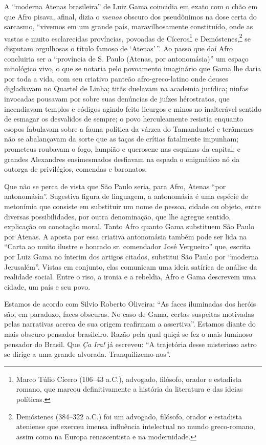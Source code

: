 A ``moderna Atenas brasileira'' de Luiz Gama coincidia em exato com o chão
em que Afro pisava, afinal, dizia o \emph{menos} obscuro dos
pseudônimos na dose certa do sarcasmo, ``vivemos em um grande país,
maravilhosamente constituído, onde as vastas e muito esclarecidas
províncias, povoadas de Cíceros\footnote{Marco Túlio Cícero (106--43 a.C.), advogado, filósofo, orador e estadista romano, que
  marcou definitivamente a história da literatura e das ideias
  políticas.} e Demóstenes,\footnote{Demóstenes (384--322 a.C.) foi
  um advogado, filósofo, orador e estadista ateniense que exerceu imensa
  influência intelectual no mundo greco-romano, assim como na Europa
  renascentista e na modernidade.} se disputam orgulhosas o título
famoso de `Atenas'\,''. Ao passo que daí Afro concluiria ser a
``província de S. Paulo (Atenas, por antonomásia)'' um espaço mitológico
vivo, o que se notaria pelo povoamento imaginário que Gama lhe daria por
toda a vida, com seu criativo panteão afro-greco-latino onde
deuses digladiavam no Quartel de Linha; titãs duelavam na
academia jurídica; ninfas invocadas pousavam por sobre suas
denúncias de juízes hérostratos, que incendiavam templos e
códigos agindo feito licurgos e minos no inalterável
sentido de esmagar os desvalidos de sempre; o povo herculeamente
resistia enquanto esopos fabulavam sobre a fauna política da
várzea do Tamanduateí e terâmenes não se abalançavam da sorte que
as taças de crítias fatalmente impunham; prometeus
roubavam o fogo, lampião e querosene nas esquinas da capital; e grandes
Alexandres ensimesmados desfiavam na espada o enigmático nó da
outorga de privilégios, comendas e baronatos.

Que não se perca de vista que São Paulo seria, para Afro, Atenas
``por antonomásia''. Sugestiva figura de linguagem, a antonomásia é uma
espécie de metonímia que consiste em substituir um nome de pessoa,
cidade ou objeto, entre diversas possibilidades, por outra denominação,
que lhe agregue sentido, explicação ou conotação moral. Tanto
Afro quanto Gama substituem São Paulo por Atenas. A aposta por
essa criativa antonomásia também pode ser lida na ``Carta ao muito
ilustre e honrado sr. comendador José Vergueiro'' que, escrita por Luiz
Gama no ínterim dos artigos citados, substitui São Paulo por ``moderna
Jerusalém''. Vistas em conjunto, elas comunicam uma ideia satírica de
análise da realidade social. Entre o riso, a ironia e a rebeldia,
Afro e Gama descrevem uma cidade, um país e seu povo.

Estamos de acordo com Silvio Roberto Oliveira: ``As faces iluminadas dos
heróis são, em paradoxo, faces obscuras. No caso de Gama, certas
suspeitas motivadas pelas narrativas acerca de sua origem reafirmam a
assertiva''. Estamos diante do mais obscuro pensador brasileiro. Razão
pela qual quiçá se fez o mais luminoso pensador do Brasil. Que \emph{Ça
Ira!} já escreveu: ``A trajetória desse misterioso astro se dirige a uma
grande alvorada. Tranquilizemo-nos''.
